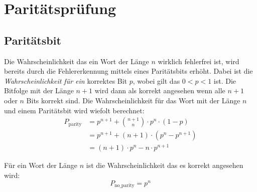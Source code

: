 \section{Paritätsprüfung}

\subsection{Paritätsbit}
Die Wahrscheinlichkeit das ein Wort der Länge $n$ wirklich fehlerfrei ist, wird bereits
durch die Fehlererkennung mittels eines Paritätsbits erhöht. Dabei ist die 
\emph{Wahrscheinlichkeit für ein} korrektes Bit $p$, wobei gilt das $0<p<1$ ist. 
Die Bitfolge mit der Länge $n+1$ wird dann als korrekt angesehen wenn alle $n+1$ oder
$n$ Bits korrekt sind. Die Wahrscheinlichkeit für das Wort mit der Länge $n$ und einem
Paritätsbit wird wiefolt berechnet:
\begin{align*}
    P_{\text{parity}}   &= p^{n+1}+\binom{n+1}{n}\cdot p^{n}\cdot\left(1-p\right)    \\
                        &= p^{n+1}+\left(n+1\right)\cdot\left(p^{n}-p^{n+1}\right)    \\
                        &= \left(n+1\right)\cdot p^{n}-n\cdot p^{n + 1}
\end{align*}

Für ein Wort der Länge $n$ ist die Wahrscheinlichkeit das es korrekt angesehen wird:
\[
P_{\text{no\_parity}} = p^{n}
\]

